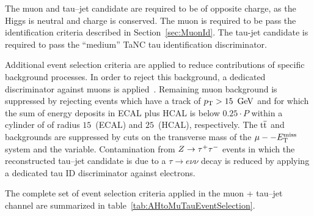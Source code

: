 The muon and tau--jet candidate are required to be of opposite charge, as the
Higgs is neutral and charge is conserved.  The muon is required to be pass the
identification criteria described in Section~\ref{sec:MuonId}.   The tau-jet
candidate is required to pass the ``medium'' TaNC tau identification 
discriminator. 

Additional event selection criteria are applied to reduce contributions of
specific background processes. In order to reject this background, a dedicated
discriminator against muons is applied~\cite{CMS-PAS-PFT-08-001}. Remaining muon
background is suppressed by rejecting events which have a track of $p_{\mathrm{T}} >
15~\,\text{Ge\hspace{-.08em}V}$ and for which the sum of energy deposits in ECAL plus HCAL is below
$0.25 \cdot P$ within a cylinder of of radius $15$~\centi\meter (ECAL) and
$25$~\centi\meter (HCAL), respectively.  The $\mathrm{t}\overline{\mathrm{t}}$ and \WpJets backgrounds
are suppressed by cuts on the transverse mass of the $\mu--E_{\mathrm{T}}^{\text{miss}}$ system and the
\Pzeta variable.  Contamination from $Z \to \tau^+\tau^-$ events in which the
reconstructed tau--jet candidate is due to a $\tau \to e \nu \nu$ decay is
reduced by applying a dedicated tau ID discriminator against electrons.

The complete set of event selection criteria applied in the muon +
tau--jet channel are summarized in table~\ref{tab:AHtoMuTauEventSelection}.

